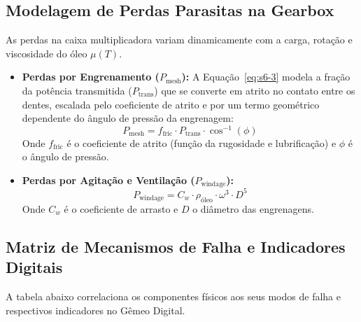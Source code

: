 \documentclass[12pt,a4paper]{article}
\numberwithin{equation}{section}
\numberwithin{table}{section}
\numberwithin{figure}{section}
\begin{document}
	\subsection{\textbf{Modelagem de Perdas Parasitas na Gearbox}}
	As perdas na caixa multiplicadora variam dinamicamente com a carga, rotação e viscosidade do óleo $\mu(T)$.
	\begin{itemize}
		\item \textbf{Perdas por Engrenamento ($P_{\text{mesh}}$):} A Equação~\eqref{eq:s6-3} modela a fração da potência transmitida ($P_{\text{trans}}$) que se converte em atrito no contato entre os dentes, escalada pelo coeficiente de atrito e por um termo geométrico dependente do ângulo de pressão da engrenagem:
		\begin{equation}\label{eq:s6-3}
 P_{\text{mesh}} = f_{\text{fric}} \cdot P_{\text{trans}} \cdot \cos^{-1}(\phi)
\end{equation}
		Onde $f_{\text{fric}}$ é o coeficiente de atrito (função da rugosidade e lubrificação) e $\phi$ é o ângulo de pressão.
		\item \textbf{Perdas por Agitação e Ventilação ($P_{\text{windage}}$):}
		\begin{equation}\label{eq:s6-4}
 P_{\text{windage}} = C_w \cdot \rho_{\text{óleo}} \cdot \omega^3 \cdot D^5 
\end{equation}
		Onde $C_w$ é o coeficiente de arrasto e $D$ o diâmetro das engrenagens.
	\end{itemize}
	
	\subsection{\textbf{Matriz de Mecanismos de Falha e Indicadores Digitais}}
	A tabela abaixo correlaciona os componentes físicos aos seus modos de falha e respectivos indicadores no Gêmeo Digital.
	
\end{document}
